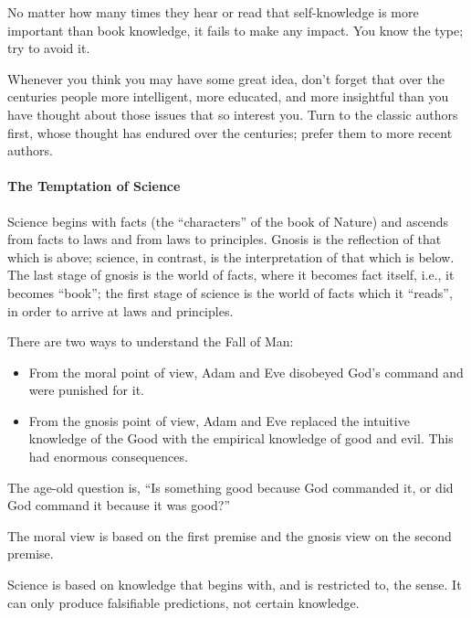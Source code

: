 No matter how many times they hear or read that self-knowledge is more important than book knowledge, it fails to make any impact. You know the type; try to avoid it.

Whenever you think you may have some great idea, don't forget that over the centuries people more intelligent, more educated, and more insightful than you have thought about those issues that so interest you. Turn to the classic authors first, whose thought has endured over the centuries; prefer them to more recent authors.

\paragraph{The Temptation of Science}
\begin{quotex}
Science begins with facts (the “characters” of the book of Nature) and ascends from facts to laws and from laws to principles. Gnosis is the reflection of that which is above; science, in contrast, is the interpretation of that which is below. The last stage of gnosis is the world of facts, where it becomes fact itself, i.e., it becomes “book”; the first stage of science is the world of facts which it “reads”, in order to arrive at laws and principles.

\end{quotex}
There are two ways to understand the Fall of Man:

\begin{itemize}
\item From the moral point of view, Adam and Eve disobeyed God's command and were punished for it. 
\item From the gnosis point of view, Adam and Eve replaced the intuitive knowledge of the Good with the empirical knowledge of good and evil. This had enormous consequences. 
\end{itemize}
The age-old question is, “Is something good because God commanded it, or did God command it because it was good?”

The moral view is based on the first premise and the gnosis view on the second premise.

Science is based on knowledge that begins with, and is restricted to, the sense. It can only produce falsifiable predictions, not certain knowledge.



